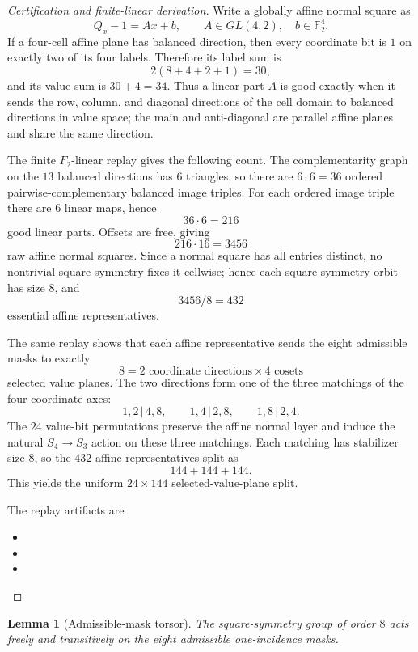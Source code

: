 \documentclass[11pt,a4paper]{article}
\newtheorem{lemma}[theorem]{Lemma}
\theoremstyle{definition}
\theoremstyle{remark}
\newcommand{\F}{\mathbb F}
\begin{document}
\begin{proof}[Certification and finite-linear derivation]
Write a globally affine normal square as
\[
Q_x-1=A x+b,\qquad A\in GL(4,2),\quad b\in\F_2^4.
\]
If a four-cell affine plane has balanced direction, then every coordinate bit
is \(1\) on exactly two of its four labels.  Therefore its label sum is
\[
2(8+4+2+1)=30,
\]
and its value sum is \(30+4=34\).  Thus a linear part \(A\) is good exactly
when it sends the row, column, and diagonal directions of the cell domain to
balanced directions in value space; the main and anti-diagonal are parallel
affine planes and share the same direction.

The finite \(F_2\)-linear replay gives the following count.  The
complementarity graph on the \(13\) balanced directions has \(6\) triangles,
so there are \(6\cdot6=36\) ordered pairwise-complementary balanced image
triples.  For each ordered image triple there are \(6\) linear maps, hence
\[
36\cdot6=216
\]
good linear parts.  Offsets are free, giving
\[
216\cdot16=3456
\]
raw affine normal squares.  Since a normal square has all entries distinct,
no nontrivial square symmetry fixes it cellwise; hence each square-symmetry
orbit has size \(8\), and
\[
3456/8=432
\]
essential affine representatives.

The same replay shows that each affine representative sends the eight
admissible masks to exactly
\[
8=2\text{ coordinate directions}\times4\text{ cosets}
\]
selected value planes.  The two directions form one of the three matchings of
the four coordinate axes:
\[
1,2\,|\,4,8,\qquad 1,4\,|\,2,8,\qquad 1,8\,|\,2,4.
\]
The \(24\) value-bit permutations preserve the affine normal layer and induce
the natural \(S_4\to S_3\) action on these three matchings.  Each matching has
stabilizer size \(8\), so the \(432\) affine representatives split as
\[
144+144+144.
\]
This yields the uniform \(24\times144\) selected-value-plane split.

The replay artifacts are
\begin{itemize}[leftmargin=*]
\item {}
\item {}
\item {}
\end{itemize}
\end{proof}

\begin{lemma}[Admissible-mask torsor]
\label{lem:mask-torsor}
The square-symmetry group of order \(8\) acts freely and transitively on the
eight admissible one-incidence masks.
\end{lemma}
\end{document}
